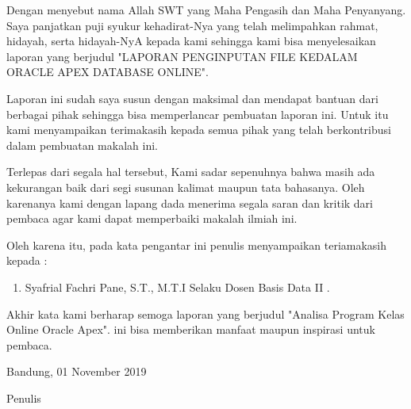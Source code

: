 \begin{acknowledgements}
Dengan menyebut nama Allah SWT yang Maha Pengasih dan Maha Penyanyang. Saya panjatkan puji syukur kehadirat-Nya yang telah melimpahkan rahmat, hidayah, serta hidayah-NyA kepada kami sehingga kami bisa menyelesaikan laporan yang berjudul "LAPORAN PENGINPUTAN FILE KEDALAM ORACLE APEX DATABASE ONLINE".

Laporan ini sudah saya susun dengan maksimal dan mendapat bantuan dari berbagai pihak sehingga bisa memperlancar pembuatan laporan ini. Untuk itu kami menyampaikan terimakasih kepada semua pihak yang telah berkontribusi dalam pembuatan makalah ini.

Terlepas dari segala hal tersebut, Kami sadar sepenuhnya bahwa masih ada kekurangan baik dari segi susunan kalimat maupun tata bahasanya. Oleh karenanya kami dengan lapang dada menerima segala saran dan kritik dari pembaca agar kami dapat memperbaiki makalah ilmiah ini.



Oleh karena itu, pada kata pengantar ini penulis menyampaikan teriamakasih kepada :
\begin{enumerate}

\item  Syafrial Fachri Pane, S.T., M.T.I Selaku Dosen Basis Data II .
\end{enumerate}

Akhir kata kami berharap semoga laporan yang berjudul "Analisa Program Kelas Online Oracle Apex". ini bisa memberikan manfaat maupun inspirasi untuk pembaca.

\begin{raggedleft}

Bandung, 01 November 2019

Penulis

\end{raggedleft}

\end{acknowledgements}